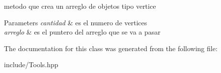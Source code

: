 metodo que crea un arreglo de objetos tipo vertice 


\begin{DoxyParams}{Parameters}
{\em cantidad} & es el numero de vertices \\
\hline
{\em arreglo} & es el puntero del arreglo que se va a pasar \\
\hline
\end{DoxyParams}


The documentation for this class was generated from the following file\+:\begin{DoxyCompactItemize}
\item 
include/Tools.\+hpp\end{DoxyCompactItemize}
